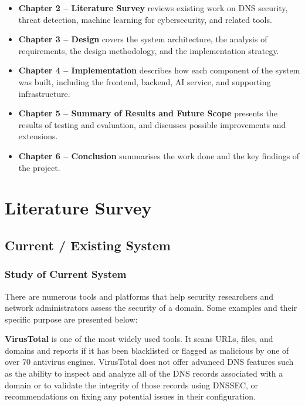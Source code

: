 \documentclass[12pt, a4paper, oneside]{report}
\begin{document}
\begin{itemize}
    \item \textbf{Chapter 2 -- Literature Survey} reviews existing work on DNS security, threat detection, machine learning for cybersecurity, and related tools.
    \item \textbf{Chapter 3 -- Design} covers the system architecture, the analysis of requirements, the design methodology, and the implementation strategy.
    \item \textbf{Chapter 4 -- Implementation} describes how each component of the system was built, including the frontend, backend, AI service, and supporting infrastructure.
    \item \textbf{Chapter 5 -- Summary of Results and Future Scope} presents the results of testing and evaluation, and discusses possible improvements and extensions.
    \item \textbf{Chapter 6 -- Conclusion} summarises the work done and the key findings of the project.
\end{itemize}

\chapter*{Literature Survey}
\setcounter{chapter}{2}
\setcounter{section}{0}

\section{Current / Existing System}

\subsection{Study of Current System}

There are numerous tools and platforms that help security researchers and network administrators assess the security of a domain. Some examples and their specific purpose are presented below:

\textbf{VirusTotal} \cite{virustotal2024} is one of the most widely used tools. It scans URLs, files, and domains and reports if it has been blacklisted or flagged as malicious by one of over 70 antivirus engines. VirusTotal does not offer advanced DNS features such as the ability to inspect and analyze all of the DNS records associated with a domain or to validate the integrity of those records using DNSSEC, or recommendations on fixing any potential issues in their configuration.
\end{document}
